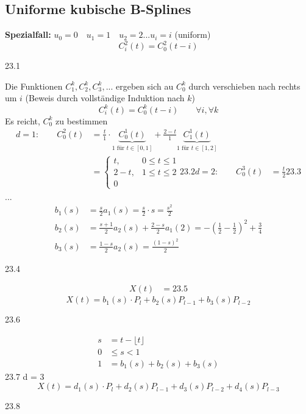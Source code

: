 \subsection{Uniforme kubische B-Splines}
\textbf{Spezialfall:} $u_0 = 0 \quad u_1 = 1 \quad u_2 = 2 ... u_i = i$ (uniform)
\[C^2_i(t) = C^2_0(t-i)\]
\begin{center}
 23.1
\end{center}
Die Funktionen $C_1^k, C_2^k, C_3^k, ...$ ergeben sich au $C_0^k$ durch verschieben nach rechts um $i$
(Beweis durch vollständige Induktion nach $k$)
\[\boxed{C_i^k(t) = C_0^k(t-i) \qquad \forall i, \forall k}\]
Es reicht, $C_0^k$ zu bestimmen
\begin{align*}
 d=1{:}\qquad C_0^2(t) &= \frac{t}{1} \cdot \underbrace{C_0^1(t)}_{1 \text{ für } t \in [0,1]} +
				\frac{2-t}{1} \underbrace{C_1^1(t)}_{1 \text{ für } t \in [1,2]}\\
		&= \begin{cases}
		    t, & 0 \le t \le 1\\
		    2-t, & 1 \le t \le 2\\
		    0
		   \end{cases}	23.2
 d=2{:}\qquad C_0^3(t) &= \frac{t}{2} 23.3
\end{align*}
...
\begin{align*}
 b_1(s) &= \frac{s}{2} a_1(s) = \frac{s}{2} \cdot s = \frac{s^2}{2}\\
 b_2(s) &= \frac{s+1}{2} a_2(s) + \frac{2-s}{2} a_1(2) = -\left(\frac{1}{2} - \frac{1}{2}\right)^2 + \frac{3}{4}\\
 b_3(s) &= \frac{1-s}{2} a_2(s) = \frac{(1-s)^2}{2}
\end{align*}
\begin{center}
 23.4
\end{center}
\begin{align*}
 X(t) &= 23.5
\end{align*}
\[X(t) = b_1(s) \cdot P_l + b_2(s) P_{l-1} + b_3(s) P_{l-2}\]
\begin{center}
 23.6
\end{center}
\begin{align*}
 s &= t - \lfloor t \rfloor\\
 0 &\le s < 1\\
 1 &= b_1(s) + b_2(s) + b_3(s)
\end{align*}
23.7 d = 3
\[X(t) = d_1(s) \cdot P_l + d_2(s) P_{l-1} + d_3(s) P_{l-2} + d_4(s) P_{l-3}\]
\begin{center}
 23.8
\end{center}
